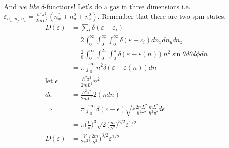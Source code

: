 \documentclass[a4paper, 11pt]{article}
\begin{document}
	And \textit{we like} $\delta$-functions! Let's do a gas in three dimensions i.e. $\varepsilon_{n_x,n_y,n_z} = \frac{\hbar^2\pi^2}{2mL^2}(n_x^2+n_y^2+n_z^2)$. Remember that there are two spin states. 
		\begin{align*}
			D(\varepsilon) &= \sum_i \delta(\varepsilon-\varepsilon_i) \\ 
				&= 2\int_0^\infty\int_0^\infty\int_0^\infty  \delta(\varepsilon-\varepsilon_i)dn_x dn_y dn_z \\ 
				&= \frac{2}{8}\int_0^\infty\int_0^{2\pi}\int_0^{\pi}\delta(\varepsilon-\varepsilon(n))n^2 \sin\theta d\theta d\phi dn \\ 
				&= \pi \int_0^\infty n^2 \delta(\varepsilon - \varepsilon(n))dn \\ 
			\text{let } \epsilon &= \frac{\hbar^2 \pi^2}{2 m L^2}n^2 \\ 
				d\epsilon &= \frac{\hbar^2 \pi^2}{2 m L^2}2(ndn) \\ 
			\Rightarrow &= \pi \int_0^\infty \delta(\varepsilon-\epsilon)\sqrt{\epsilon\frac{2mL^2}{\hbar^2\pi^2}}\frac{mL^2}{\hbar^2\pi^2} d\epsilon  \\ 
			&= \pi \Big(\frac{L}{\pi}\Big)^3\sqrt{2}\Big(\frac{m}{\hbar^2}\Big)^{3/2}\varepsilon^{1/2} \\ 
		D(\varepsilon)	&= \frac{V}{2\pi^2}\Big(\frac{2m}{\hbar^2}\Big)^{3/2}\varepsilon^{1/2}
		\end{align*}
	
	
	
	
	
	
	
	
	
	
\end{document}
